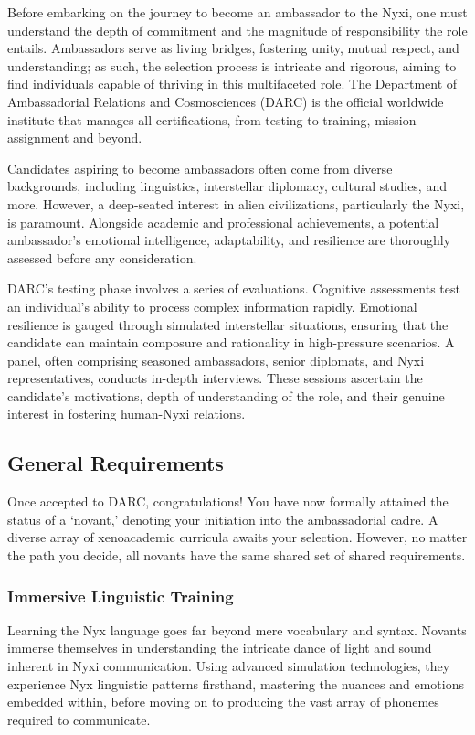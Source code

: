 Before embarking on the journey to become an ambassador to the Nyxi, one must
understand the depth of commitment and the magnitude of responsibility the role
entails. Ambassadors serve as living bridges, fostering unity, mutual respect,
and understanding; as such, the selection process is intricate and rigorous,
aiming to find individuals capable of thriving in this multifaceted role. The
Department of Ambassadorial Relations and Cosmosciences (DARC) is the official
worldwide institute that manages all certifications, from testing to training,
mission assignment and beyond.

Candidates aspiring to become ambassadors often come from diverse backgrounds,
including linguistics, interstellar diplomacy, cultural studies, and more.
However, a deep-seated interest in alien civilizations, particularly the Nyxi,
is paramount. Alongside academic and professional achievements, a potential
ambassador's emotional intelligence, adaptability, and resilience are
thoroughly assessed before any consideration.

DARC's testing phase involves a series of evaluations. Cognitive assessments
test an individual's ability to process complex information rapidly. Emotional
resilience is gauged through simulated interstellar situations, ensuring that
the candidate can maintain composure and rationality in high-pressure
scenarios. A panel, often comprising seasoned ambassadors, senior diplomats,
and Nyxi representatives, conducts in-depth interviews. These sessions
ascertain the candidate's motivations, depth of understanding of the role, and
their genuine interest in fostering human-Nyxi relations.

\subsection{General Requirements}

Once accepted to DARC, congratulations! You have now formally attained the
status of a `novant,' denoting your initiation into the ambassadorial cadre. A
diverse array of xenoacademic curricula awaits your selection. However, no
matter the path you decide, all novants have the same shared set of shared
requirements.

\subsubsection{Immersive Linguistic Training}
Learning the Nyx language goes far beyond mere vocabulary and syntax. Novants
immerse themselves in understanding the intricate dance of light and sound
inherent in Nyxi communication. Using advanced simulation technologies, they
experience Nyx linguistic patterns firsthand, mastering the nuances and
emotions embedded within, before moving on to producing the vast array of
phonemes required to communicate.

